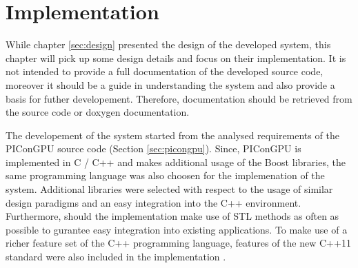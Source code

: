\chapter{Implementation}
\label{sec:implementation}



While chapter \ref{sec:design} presented the design of the developed
system, this chapter will pick up some design details and focus on
their implementation.  It is not intended to provide a full
documentation of the developed source code, moreover it should be a
guide in understanding the system and also provide a basis for futher
developement. Therefore, documentation should be retrieved from the
source code or doxygen \cite{ref:doxygen} documentation.

The developement of the system started from the analysed requirements
of the PIConGPU source code (Section \ref{sec:picongpu}). Since,
PIConGPU is implemented in C / C++ and makes additional usage of the
Boost \cite{ref:boost} libraries, the same programming language was
also choosen for the implemenation of the system. Additional libraries were
selected with respect to the usage of similar design paradigms and an
easy integration into the C++ environment. Furthermore, should the
implementation make use of STL methods as often as possible to
gurantee easy integration into existing applications.  To make use of
a richer feature set of the C++ programming language, features of the
new C++11 standard were also included in the implementation
\cite{ref:c++11}.

